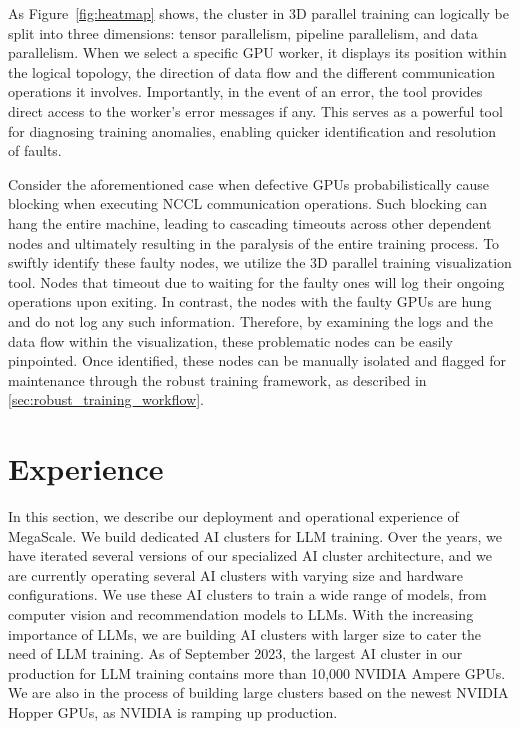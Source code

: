 \documentclass[letterpaper,twocolumn,10pt]{article}
\newcommand{\sysname}{MegaScale\xspace}
\begin{document}
As Figure~\ref{fig:heatmap} shows, the cluster in 3D parallel training can
logically be split into three dimensions: tensor parallelism, pipeline
parallelism, and data parallelism. When we select a specific GPU worker, it
displays its position within the logical topology, the direction of data flow
and the different communication operations it involves. Importantly, in the
event of an error, the tool provides direct access to the worker's error
messages if any. This serves as a powerful tool for diagnosing training
anomalies, enabling quicker identification and resolution of faults.

Consider the aforementioned case when defective GPUs probabilistically cause blocking when executing NCCL communication operations. Such blocking can hang the entire machine, leading to cascading timeouts across other dependent nodes and ultimately resulting in the paralysis of the entire training process. To swiftly identify these faulty nodes, we utilize the 3D parallel training visualization tool. Nodes that timeout due to waiting for the faulty ones will log their ongoing operations upon exiting. In contrast, the nodes with the faulty GPUs are hung and do not log any such information. Therefore, by examining the logs and the data flow within the visualization, these problematic nodes can be easily pinpointed. Once identified, these nodes can be manually isolated and flagged for maintenance through the robust training framework, as described in \ref{sec:robust_training_workflow}.
\section{Experience}
\label{sec:experience}

In this section, we describe our deployment and operational experience of
\sysname. We build dedicated AI clusters for LLM training. Over the years, we
have iterated several versions of our specialized AI cluster architecture, and
we are currently operating several AI clusters with varying size and hardware
configurations. We use these AI clusters to train a wide range of models, from
computer vision and recommendation models to LLMs. With the increasing
importance of LLMs, we are building AI clusters with larger size to cater the
need of LLM training. As of September 2023, the largest AI cluster in our
production for LLM training contains more than 10,000 NVIDIA Ampere GPUs. We are
also in the process of building large clusters based on the newest NVIDIA Hopper
GPUs, as NVIDIA is ramping up production.
\end{document}
